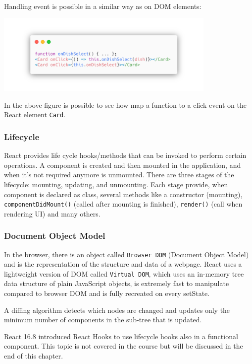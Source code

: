 Handling event is possible in a similar way as on DOM elements:

\begin{center}
    \includegraphics[width=0.8\textwidth]{assets/react-event-handling.png}
\end{center}

In the above figure is possible to see how map a function to a click event on the React element \texttt{Card}.

\subsubsection*{Lifecycle}
React provides life cycle hooks/methods that can be invoked to perform certain operations. A component is created and then mounted in the application, and when it's not required anymore is unmounted. There are three stages of the lifecycle: mounting, updating, and unmounting. Each stage provide, when component is declared as class, several methods like a constructor (mounting), \texttt{componentDidMount()} (called after mounting is finished), \texttt{render()} (call when rendering UI) and many others.

\subsubsection*{Document Object Model}
In the browser, there is an object called \texttt{Browser DOM} (Document Object Model) and is the representation of the structure and data of a webpage. React uses a lightweight version of DOM called \texttt{Virtual DOM}, which uses an in-memory tree data structure of plain JavaScript objects, is extremely fast to manipulate compared to browser DOM and is fully recreated on every setState. 

A diffing algorithm detects which nodes are changed and updates only the minimum number of components in the sub-tree that is updated.

React 16.8 introduced React Hooks to use lifecycle hooks also in a functional component. This topic is not covered in the course but will be discussed in the end of this chapter.

